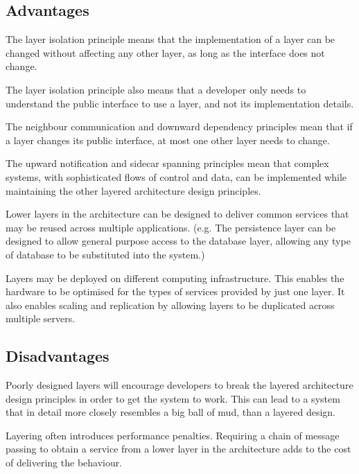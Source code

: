 \subsection{Advantages}
The layer isolation principle means that the implementation of a layer can be changed without affecting any other layer,
as long as the interface does not change.

The layer isolation principle also means that a developer only needs to understand the public interface to use a layer, and not its implementation details.

The neighbour communication and downward dependency principles mean that if a layer changes its public interface, at most one other layer needs to change.

The upward notification and sidecar spanning principles mean that complex systems, with sophisticated flows of control and data,
can be implemented while maintaining the other layered architecture design principles.

Lower layers in the architecture can be designed to deliver common services that may be reused across multiple applications.
(e.g. The persistence layer can be designed to allow general purpose access to the database layer, allowing any type of database to be substituted into the system.)

Layers may be deployed on different computing infrastructure. This enables the hardware to be optimised for the types of services provided by just one layer.
It also enables scaling and replication by allowing layers to be duplicated across multiple servers.

\subsection{Disadvantages}
Poorly designed layers will encourage developers to break the layered architecture design principles in order to get the system to work.
This can lead to a system that in detail more closely resembles a big ball of mud, than a layered design.

Layering often introduces performance penalties.
Requiring a chain of message passing to obtain a service from a lower layer in the architecture adds to the cost of delivering the behaviour.
